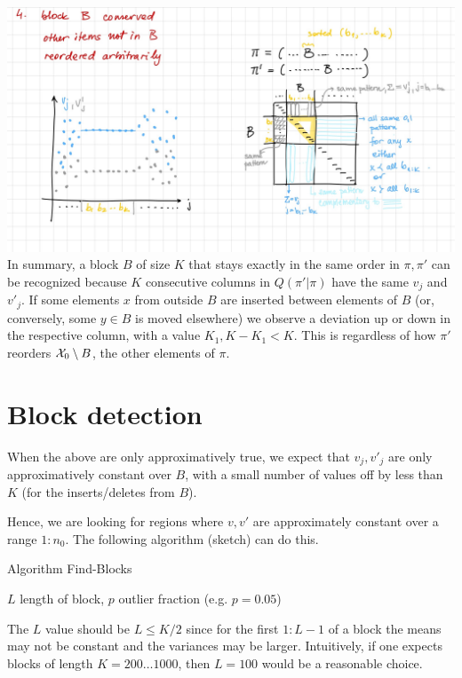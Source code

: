 \documentclass[10pt]{article}
\newlength{\picwi}
\begin{document}
\includegraphics[width=\picwi]{Figs/fig-blocks-QB.jpg}
%
In summary, a block $B$  of size $K$ that stays exactly in the same order in $\pi,\pi'$ can be recognized because $K$ consecutive columns in $Q(\pi'|\pi)$ have the same $v_j$ and $v'_j$. If some elements $x$ from outside $B$ are inserted between elements of $B$ (or, conversely, some $y\in B$ is moved elsewhere) we observe a deviation up or down in the respective column, with a value $K_1, K-K_1 < K$. This is regardless of how $\pi'$ reorders ${\mathcal X}_0\setminus B$, the other elements of $\pi$.

\section{Block detection}
\label{sec:alg-block}
When the above are only approximatively true, we expect that
$v_j,v'_j$ are only approximatively constant over $B$, with a small
number of values off by less than $K$ (for the inserts/deletes from
$B$).

Hence, we are looking for regions where $v,v'$ are approximately
constant over a range $1:n_0$. The following algorithm (sketch) can
do this.
\begin{algorithm}{Algorithm {\sc Find-Blocks}}
\begin{algorithmic}[1]
   $L$ length of block, $p$ outlier fraction (e.g. $p=0.05$)
  \EndFor
\end{algorithmic}
\end{algorithm}
%
The $L$ value should be $L\leq K/2$ since for the first $1:L-1$ of a block the means may not be constant and the variances may be larger.  Intuitively, if one expects blocks of length $K=200\ldots 1000$, then $L=100$ would be a reasonable choice.
\end{document}
